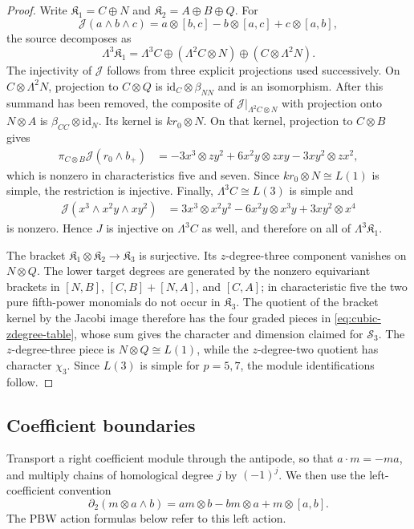 \documentclass[11pt]{article}
\theoremstyle{plain}
\theoremstyle{definition}
\theoremstyle{remark}
\numberwithin{equation}{section}
\newcommand{\kk}{k}
\newcommand{\Kalg}{\mathfrak K}
\begin{document}
\begin{proof}
Write $\Kalg_1=C\oplus N$ and $\Kalg_2=A\oplus B\oplus Q$.  For
\[
 \mathcal J(a\wedge b\wedge c)
 =a\otimes[b,c]-b\otimes[a,c]+c\otimes[a,b],
\]
the source decomposes as
\[
 \Lambda^3\Kalg_1
 =\Lambda^3C\oplus(\Lambda^2C\otimes N)\oplus(C\otimes\Lambda^2N).
\]
The injectivity of $\mathcal J$ follows from three explicit projections used successively.  On
$C\otimes\Lambda^2N$, projection to $C\otimes Q$ is
$\mathrm{id}_C\otimes\beta_{NN}$ and is an isomorphism.  After this summand has been
removed, the composite of $\mathcal J|_{\Lambda^2C\otimes N}$ with projection onto $N\otimes A$ is
$\beta_{CC}\otimes\mathrm{id}_N$.  Its kernel is $\kk r_0\otimes N$.  On that kernel,
projection to $C\otimes B$ gives
\begin{align*}
 \pi_{C\otimes B}\mathcal J(r_0\wedge b_+)
 &=-3x^3\otimes zy^2
   +6x^2y\otimes zxy
   -3xy^2\otimes zx^2,
\end{align*}
which is nonzero in characteristics five and seven.  Since
$\kk r_0\otimes N\cong L(1)$ is simple, the restriction is injective.  Finally,
$\Lambda^3C\cong L(3)$ is simple and
\begin{align*}
 \mathcal J(x^3\wedge x^2y\wedge xy^2)
 &=3x^3\otimes x^2y^2
   -6x^2y\otimes x^3y
   +3xy^2\otimes x^4
\end{align*}
is nonzero.  Hence $J$ is injective on $\Lambda^3C$ as well, and therefore on all of
$\Lambda^3\Kalg_1$.

The bracket $\Kalg_1\otimes\Kalg_2\to\Kalg_3$ is surjective.  Its $z$-degree-three
component vanishes on $N\otimes Q$.  The lower target degrees are generated by
the nonzero equivariant brackets in $[N,B]$, $[C,B]+[N,A]$, and $[C,A]$; in characteristic
five the two pure fifth-power monomials do not occur in $\Kalg_3$.  The quotient of the
bracket kernel by the Jacobi image therefore has the four graded pieces in
\eqref{eq:cubic-zdegree-table}, whose sum gives the character and dimension claimed for
$\mathcal S_3$.  The $z$-degree-three piece is $N\otimes Q\cong L(1)$, while the $z$-degree-two quotient has
character $\chi_3$.  Since $L(3)$ is simple for $p=5,7$, the module identifications follow.
\end{proof}

\subsection{Coefficient boundaries}\label{sec:filtration}

Transport a right coefficient module through the antipode, so that
$a\cdot m=-ma$, and multiply chains of homological degree $j$ by $(-1)^j$.
We then use the left-coefficient convention
\begin{equation}\label{eq:left-boundary}
 \partial_2(m\otimes a\wedge b)
 =am\otimes b-bm\otimes a+m\otimes[a,b].
\end{equation}
The PBW action formulas below refer to this left action.
\end{document}

